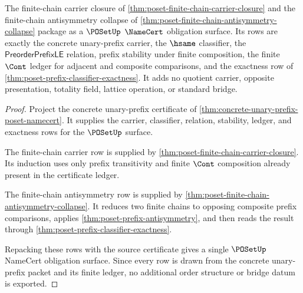 \begin{theorem}
\label{thm:poset-finite-chain-namecert-surface}
The finite-chain carrier closure of
\autoref{thm:poset-finite-chain-carrier-closure} and the finite-chain
antisymmetry collapse of
\autoref{thm:poset-finite-chain-antisymmetry-collapse} package as a
$\POSetUp$ $\NameCert$ obligation surface. Its rows are exactly the concrete
unary-prefix carrier, the $\hsame$ classifier, the
$\mathsf{PreorderPrefixLE}$ relation, prefix stability under finite
composition, the finite $\Cont$ ledger for adjacent and composite comparisons,
and the exactness row of
\autoref{thm:poset-prefix-classifier-exactness}. It adds no quotient carrier,
opposite presentation, totality field, lattice operation, or standard bridge.
\end{theorem}
\begin{proof}
Project the concrete unary-prefix certificate of
\autoref{thm:concrete-unary-prefix-poset-namecert}. It supplies the carrier,
classifier, relation, stability, ledger, and exactness rows for the
$\POSetUp$ surface.

The finite-chain carrier row is supplied by
\autoref{thm:poset-finite-chain-carrier-closure}. Its induction uses only
prefix transitivity and finite $\Cont$ composition already present in the
certificate ledger.

The finite-chain antisymmetry row is supplied by
\autoref{thm:poset-finite-chain-antisymmetry-collapse}. It reduces two finite
chains to opposing composite prefix comparisons, applies
\autoref{thm:poset-prefix-antisymmetry}, and then reads the result through
\autoref{thm:poset-prefix-classifier-exactness}.

Repacking these rows with the source certificate gives a single
$\POSetUp$ NameCert obligation surface. Since every row is drawn from the
concrete unary-prefix packet and its finite ledger, no additional order
structure or bridge datum is exported.
\end{proof}
